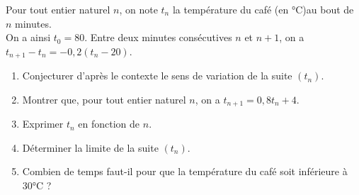 \documentclass[a4paper,11pt,eval]{nsi}
\begin{document}
Pour tout entier naturel $n$, on note $t_n$ la température du café (en °C)au bout de $n$ minutes.\\
On a ainsi $t_0=80$. Entre deux minutes consécutives $n$ et $n+1$, on a $t_{n+1}-t_n=-0,2(t_n-20)$.
\begin{enumerate}
    \item Conjecturer d'après le contexte le sens de variation de la suite $(t_n)$.
    \item Montrer que, pour tout entier naturel $n$, on a $t_{n+1}=0,8t_n+4$.
    \item Exprimer $t_n$ en fonction de $n$.
    \item Déterminer la limite de la suite $(t_n)$.
    \item \faCalculator \hspace*{.2cm} Combien de temps faut-il pour que la température du café soit inférieure à 30°C ?
\end{enumerate}
\end{document}
